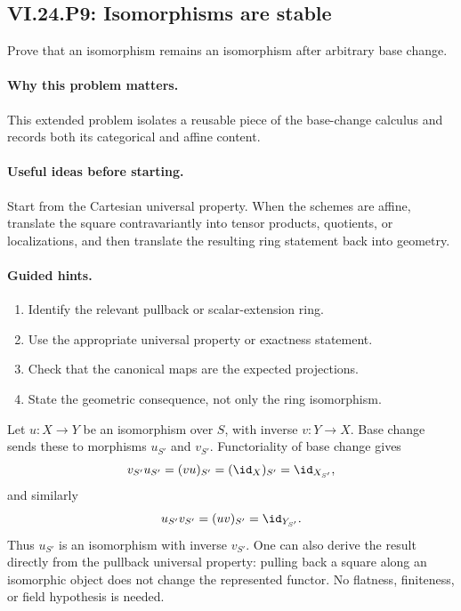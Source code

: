 \subsection*{VI.24.P9: Isomorphisms are stable}
\begin{problem}\label{prob:vi24-p09}
Prove that an isomorphism remains an isomorphism after arbitrary base change.
\end{problem}

\ifdefined\FullProblemDossiers
\paragraph{Why this problem matters.}
This extended problem isolates a reusable piece of the base-change calculus and records both its categorical and affine content.

\paragraph{Useful ideas before starting.}
Start from the Cartesian universal property.  When the schemes are affine, translate the square contravariantly into tensor products, quotients, or localizations, and then translate the resulting ring statement back into geometry.

\paragraph{Guided hints.}
\begin{enumerate}
\item Identify the relevant pullback or scalar-extension ring.
\item Use the appropriate universal property or exactness statement.
\item Check that the canonical maps are the expected projections.
\item State the geometric consequence, not only the ring isomorphism.
\end{enumerate}

\begin{solution}
Let $u:X\to Y$ be an isomorphism over $S$, with inverse $v:Y\to X$.  Base change sends these to morphisms $u_{S'}$ and $v_{S'}$.  Functoriality of base change gives
\[
v_{S'}u_{S'}=(vu)_{S'}=(\id_X)_{S'}=\id_{X_{S'}},
\]
and similarly
\[
u_{S'}v_{S'}=(uv)_{S'}=\id_{Y_{S'}}.
\]
Thus $u_{S'}$ is an isomorphism with inverse $v_{S'}$.  One can also derive the result directly from the pullback universal property: pulling back a square along an isomorphic object does not change the represented functor.  No flatness, finiteness, or field hypothesis is needed.
\end{solution}

